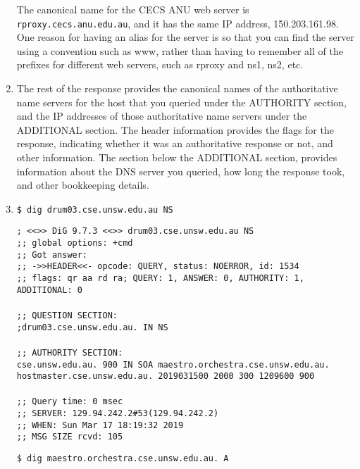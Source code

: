 \documentclass[a4paper,11pt]{article}
\newcommand{\code}{\texttt}
\begin{document}
\begin{enumerate}[leftmargin=*]
		The canonical name for the CECS ANU web server is \code{rproxy.cecs.anu.edu.au}, and it has the same IP address, 150.203.161.98. One reason for having an alias for the server is so that you can find the server using a convention such as www, rather than having to remember all of the prefixes for different web servers, such as rproxy and ns1, ns2, etc.

	\pagebreak

	\item The rest of the response provides the canonical names of the authoritative name servers for the host that you queried under the AUTHORITY section, and the IP addresses of those authoritative name servers under the ADDITIONAL section. The header information provides the flags for the response, indicating whether it was an authoritative response or not, and other information. The section below the ADDITIONAL section, provides information about the DNS server you queried, how long the response took, and other bookkeeping details.

	\item \code{\$ dig drum03.cse.unsw.edu.au NS}

	\code{; <<>> DiG 9.7.3 <<>> drum03.cse.unsw.edu.au NS\\
	;; global options: +cmd\\
	;; Got answer:\\
	;; ->>HEADER<<- opcode: QUERY, status: NOERROR, id: 1534\\
	;; flags: qr aa rd ra; QUERY: 1, ANSWER: 0, AUTHORITY: 1, ADDITIONAL: 0\\
	\\
	;; QUESTION SECTION:\\
	;drum03.cse.unsw.edu.au.		IN	NS\\
	\\
	;; AUTHORITY SECTION:\\
	cse.unsw.edu.au.	900	IN	SOA	maestro.orchestra.cse.unsw.edu.au.\\
	hostmaster.cse.unsw.edu.au. 2019031500 2000 300 1209600 900\\
	\\
	;; Query time: 0 msec\\
	;; SERVER: 129.94.242.2\#53(129.94.242.2)\\
	;; WHEN: Sun Mar 17 18:19:32 2019\\
	;; MSG SIZE  rcvd: 105\\}

	\code{\$ dig maestro.orchestra.cse.unsw.edu.au. A}


\end{enumerate}
\end{document}
